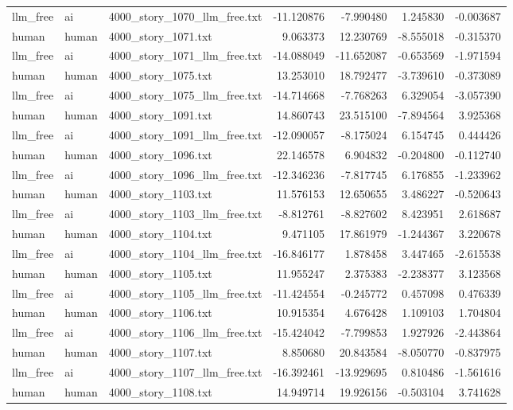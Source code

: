 \begin{longtable}{lllrrrr}
llm\_free & ai & 4000\_story\_1070\_llm\_free.txt & -11.120876 & -7.990480 & 1.245830 & -0.003687 \\
human & human & 4000\_story\_1071.txt & 9.063373 & 12.230769 & -8.555018 & -0.315370 \\
llm\_free & ai & 4000\_story\_1071\_llm\_free.txt & -14.088049 & -11.652087 & -0.653569 & -1.971594 \\
human & human & 4000\_story\_1075.txt & 13.253010 & 18.792477 & -3.739610 & -0.373089 \\
llm\_free & ai & 4000\_story\_1075\_llm\_free.txt & -14.714668 & -7.768263 & 6.329054 & -3.057390 \\
human & human & 4000\_story\_1091.txt & 14.860743 & 23.515100 & -7.894564 & 3.925368 \\
llm\_free & ai & 4000\_story\_1091\_llm\_free.txt & -12.090057 & -8.175024 & 6.154745 & 0.444426 \\
human & human & 4000\_story\_1096.txt & 22.146578 & 6.904832 & -0.204800 & -0.112740 \\
llm\_free & ai & 4000\_story\_1096\_llm\_free.txt & -12.346236 & -7.817745 & 6.176855 & -1.233962 \\
human & human & 4000\_story\_1103.txt & 11.576153 & 12.650655 & 3.486227 & -0.520643 \\
llm\_free & ai & 4000\_story\_1103\_llm\_free.txt & -8.812761 & -8.827602 & 8.423951 & 2.618687 \\
human & human & 4000\_story\_1104.txt & 9.471105 & 17.861979 & -1.244367 & 3.220678 \\
llm\_free & ai & 4000\_story\_1104\_llm\_free.txt & -16.846177 & 1.878458 & 3.447465 & -2.615538 \\
human & human & 4000\_story\_1105.txt & 11.955247 & 2.375383 & -2.238377 & 3.123568 \\
llm\_free & ai & 4000\_story\_1105\_llm\_free.txt & -11.424554 & -0.245772 & 0.457098 & 0.476339 \\
human & human & 4000\_story\_1106.txt & 10.915354 & 4.676428 & 1.109103 & 1.704804 \\
llm\_free & ai & 4000\_story\_1106\_llm\_free.txt & -15.424042 & -7.799853 & 1.927926 & -2.443864 \\
human & human & 4000\_story\_1107.txt & 8.850680 & 20.843584 & -8.050770 & -0.837975 \\
llm\_free & ai & 4000\_story\_1107\_llm\_free.txt & -16.392461 & -13.929695 & 0.810486 & -1.561616 \\
human & human & 4000\_story\_1108.txt & 14.949714 & 19.926156 & -0.503104 & 3.741628 \\

\end{longtable}
